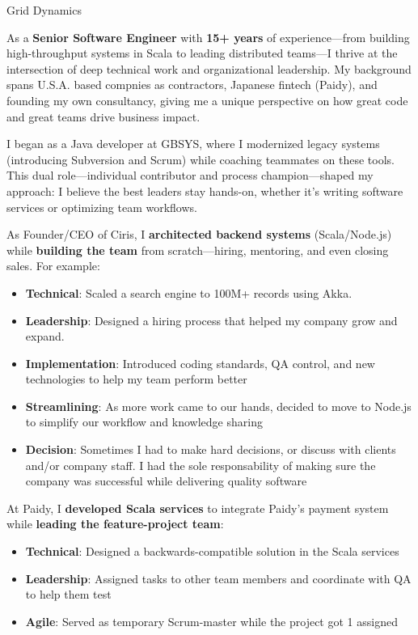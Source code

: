 \documentclass[10.5pt]{letter}
\date{\today}
\newcommand{\companyName}{Grid Dynamics}
\begin{document}
\begin{letter}{
    \companyName
}

\opening{}

\par
As a \textbf{Senior Software Engineer} with \textbf{15+ years} of experience—from building high-throughput systems in Scala to leading distributed teams—I thrive at the intersection of deep technical work and organizational leadership. My background spans U.S.A. based compnies as contractors, Japanese fintech (Paidy), and founding my own consultancy, giving me a unique perspective on how great code and great teams drive business impact.

\par
I began as a Java developer at GBSYS, where I modernized legacy systems (introducing Subversion and Scrum) while coaching teammates on these tools. This dual role—individual contributor and process champion—shaped my approach: I believe the best leaders stay hands-on, whether it’s writing software services or optimizing team workflows.

\par
As Founder/CEO of Ciris, I \textbf{architected backend systems} (Scala/Node.js) while \textbf{building the team} from scratch—hiring, mentoring, and even closing sales. For example:
\begin{itemize}
    \item \textbf{Technical}: Scaled a search engine to 100M+ records using Akka.
    \item \textbf{Leadership}: Designed a hiring process that helped my company grow and expand.
    \item \textbf{Implementation}: Introduced coding standards, QA control, and new technologies to help my team perform better
    \item \textbf{Streamlining}: As more work came to our hands, decided to move to Node.js to simplify our workflow and knowledge sharing
    \item \textbf{Decision}: Sometimes I had to make hard decisions, or discuss with clients and/or company staff. I had the sole responsability of making sure the company was successful while delivering quality software
\end{itemize}

\par
At Paidy, I \textbf{developed Scala services} to integrate Paidy's payment system while \textbf{leading the feature-project team}:
\begin{itemize}
    \item \textbf{Technical}: Designed a backwards-compatible solution in the Scala services
    \item \textbf{Leadership}: Assigned tasks to other team members and coordinate with QA to help them test
    \item \textbf{Agile}: Served as temporary Scrum-master while the project got 1 assigned
\end{itemize}


\end{letter}
\end{document}
